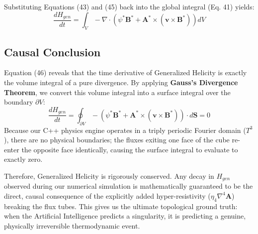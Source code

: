 \documentclass[11pt, a4paper]{article}
\begin{document}
Substituting Equations (43) and (45) back into the global integral (Eq. 41) yields:
\begin{equation}
    \frac{d H_{gen}}{dt} = \int_V -\nabla \cdot \left( \psi^* \mathbf{B}^* + \mathbf{A}^* \times (\mathbf{v} \times \mathbf{B}^*) \right) dV
\end{equation}

\subsection{Causal Conclusion}
Equation (46) reveals that the time derivative of Generalized Helicity is exactly the volume integral of a pure divergence. By applying \textbf{Gauss's Divergence Theorem}, we convert this volume integral into a surface integral over the boundary $\partial V$:
\begin{equation}
    \frac{d H_{gen}}{dt} = \oint_{\partial V} - \left( \psi^* \mathbf{B}^* + \mathbf{A}^* \times (\mathbf{v} \times \mathbf{B}^*) \right) \cdot d\mathbf{S} = 0
\end{equation}
Because our C++ physics engine operates in a triply periodic Fourier domain ($T^3$), there are no physical boundaries; the fluxes exiting one face of the cube re-enter the opposite face identically, causing the surface integral to evaluate to exactly zero. 

Therefore, Generalized Helicity is rigorously conserved. Any decay in $H_{gen}$ observed during our numerical simulation is mathematically guaranteed to be the direct, causal consequence of the explicitly added hyper-resistivity ($\eta_4 \nabla^4 \mathbf{A}$) breaking the flux tubes. This gives us the ultimate topological ground truth: when the Artificial Intelligence predicts a singularity, it is predicting a genuine, physically irreversible thermodynamic event.
\end{document}
